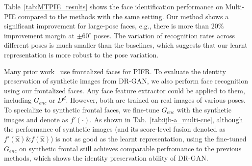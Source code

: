 \documentclass[10pt,journal,compsoc]{IEEEtran}
\begin{document}
Table~\ref{tab:MTPIE_results} shows the face identification performance on Multi-PIE compared to the methods with the same setting. 
Our method shows a significant improvement for large-pose faces, e.g., there is more than $20\%$ improvement margin at $\pm 60^\circ$ poses.
The variation of recognition rates across different poses is much smaller than the baselines, which suggests that our learnt representation is more robust to the pose variation. 
 

Many prior work~\cite{hassner2015effective, zhu2015high} use frontalized faces for PIFR. 
To evaluate the identity preservation of synthetic images from DR-GAN, we also perform face recognition using our frontalized faces. 
Any face feature extractor could be applied to them, including $G_{enc}$ or $D^d$.
However, both are trained on real images of various poses. 
To specialize to synthetic frontal faces, we fine-tune $G_{enc}$ with the synthetic images and denote as $f'(\cdot)$. 
As shown in Tab.~\ref{tab:ijb-a_multi-cue}, although the performance of synthetic images (and its score-level fusion denoted as $f'(\hat{\mathbf{x}}) \& f(\hat{\mathbf{x}})$) is not as good as the learnt representation, using the fine-tuned $G_{enc}$ on synthetic frontal still achieves comparable perfromance to the previous methods, which shows the identity preservation ability of DR-GAN.
\end{document}
